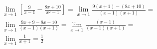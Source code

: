 \begin{ex}
\begin{align}
&\lim_{x\rightarrow 1} \left[\frac{9}{x-1}-\frac{8x+10}{x^2-1}\right]=\lim_{x\rightarrow 1} \frac{9(x+1)-(8x+10)}{(x-1)(x+1)}=\nonumber\\
&\lim_{x\rightarrow 1} \frac{9x+9-8x-10}{(x-1)(x+1)}=\lim_{x\rightarrow 1} \frac{(x-1)}{(x-1)(x+1)}=\nonumber\\
&\lim_{x\rightarrow 1} \frac{1}{x+1}=\frac{1}{2}\nonumber
\end{align}
\end{ex}